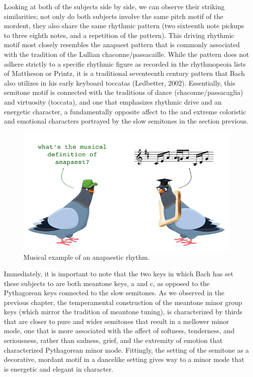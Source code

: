     Looking at both of the subjects side by side, we can observe their
striking similarities; not only do both subjects involve the same pitch
motif of the mordent, they also share the same rhythmic pattern (two
sixteenth note pickups to three eighth notes, and a repetition of the
pattern). This driving rhythmic motif most closely resembles the
anapaest pattern that is commonly associated with the tradition of the
Lullian chaconne/passacaille. While the pattern does not adhere strictly
to a specific rhythmic figure as recorded in the rhythmopeoia lists of
Mattheson or Printz, it is a traditional seventeenth century pattern
that Bach also utilizes in his early keyboard toccatas (Ledbetter,
2002). Essentially, this semitone motif is connected with the traditions
of dance (chaconne/passacaglia) and virtuosity (toccata), and one that
emphasizes rhythmic drive and an energetic character, a fundamentally
opposite affect to the and extreme coloristic and emotional characters
portrayed by the slow semitones in the section previous.
\begin{figure}[H]
\begin{center}
    \includegraphics{anapest4.png}
\end{center}
\caption{Musical example of an anapaestic rhythm.}
\end{figure}
    Immediately, it is important to note that the two keys in which Bach has
set these subjects to are both meantone keys, a and c, as opposed to the
Pythagorean keys connected to the slow semitones. As we observed in the
previous chapter, the temperamental construction of the meantone minor
group keys (which mirror the tradition of meantone tuning), is
characterized by thirds that are closer to pure and wider semitones that
result in a mellower minor mode, one that is more associated with the
affect of softness, tenderness, and seriousness, rather than sadness,
grief, and the extremity of emotion that characterized Pythagorean minor
mode. Fittingly, the setting of the semitone as a decorative, mordant
motif in a dancelike setting gives way to a minor mode that is energetic
and elegant in character.

